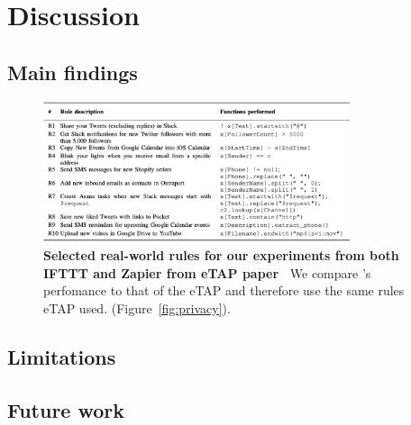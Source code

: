 \section{Discussion}
\label{sec:discussion}

\subsection{Main findings}

\begin{figure}
\includegraphics[width=9cm]{../graphics/etap.png}
\caption{\textbf{Selected real-world rules for our experiments from both IFTTT and Zapier from eTAP
	paper~\cite{DBLP:conf/sp/ChenCWSCF21}} We compare \sys's perfomance to that of the eTAP and therefore use the same rules eTAP used. (Figure~\ref{fig:privacy}).}
\label{fig:eTAP-rules}
\end{figure}


\subsection{Limitations}

\subsection{Future work}

